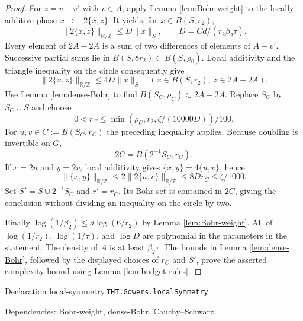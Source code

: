 \documentclass[11pt]{article}
\theoremstyle{definition}
\newcommand{\R}{\mathbb R}
\newcommand{\Z}{\mathbb Z}
\numberwithin{equation}{section}
\newcommand{\bp}[3]{\par\smallskip\begingroup\footnotesize
\noindent\hypertarget{bp:#1}{\textsf{Declaration #1.}}\quad\nolinkurl{#2}\par
\noindent\textsf{Dependencies:} #3.\par\endgroup\smallskip}
\begin{document}
\begin{proof}
For $z=v-v'$ with $v\in A$, apply Lemma \ref{lem:Bohr-weight} to the locally additive phase $x\mapsto-2\{x,z\}$. It yields, for $x\in B(S,r_2)$,
\[
 \|2\{x,z\}\|_{\R/\Z}\le D\|x\|_S,
 \qquad D=Cd/(r_2\beta_2\tau).
\]
Every element of $2A-2A$ is a sum of two differences of elements of $A-v'$. Successive partial sums lie in $B(S,8r_2)\subset B(S,\rho_0)$. Local additivity and the triangle inequality on the circle consequently give
\[
 \|2\{x,z\}\|_{\R/\Z}\le4D\|x\|_S
 \quad(x\in B(S,r_2),\ z\in2A-2A).
\]
Use Lemma \ref{lem:dense-Bohr} to find $B(S_C,\rho_C)\subset2A-2A$. Replace $S_C$ by $S_C\cup S$ and choose
\[
 0<r_C\le\min(\rho_C,r_2,\zeta/(10000D))/100.
\]
For $u,v\in C:=B(S_C,r_C)$ the preceding inequality applies. Because doubling is invertible on $G$,
\[
 2C=B(2^{-1}S_C,r_C).
\]
If $x=2u$ and $y=2v$, local additivity gives $\{x,y\}=4\{u,v\}$, hence
\[
 \|\{x,y\}\|_{\R/\Z}\le2\|2\{u,v\}\|_{\R/\Z}
 \le8Dr_C\le\zeta/1000.
\]
Set $S'=S\cup2^{-1}S_C$ and $r'=r_C$. Its Bohr set is contained in $2C$, giving the conclusion without dividing an inequality on the circle by two.

Finally $\log(1/\beta_2)\le d\log(6/r_2)$ by Lemma \ref{lem:Bohr-weight}. All of $\log(1/r_2)$, $\log(1/\tau)$, and $\log D$ are polynomial in the parameters in the statement. The density of $A$ is at least $\beta_2\tau$. The bounds in Lemma \ref{lem:dense-Bohr}, followed by the displayed choices of $r_C$ and $S'$, prove the asserted complexity bound using Lemma \ref{lem:budget-rules}.
\end{proof}
\bp{local-symmetry}{THT.Gowers.localSymmetry}{Bohr-weight, dense-Bohr, Cauchy--Schwarz}
\end{document}
